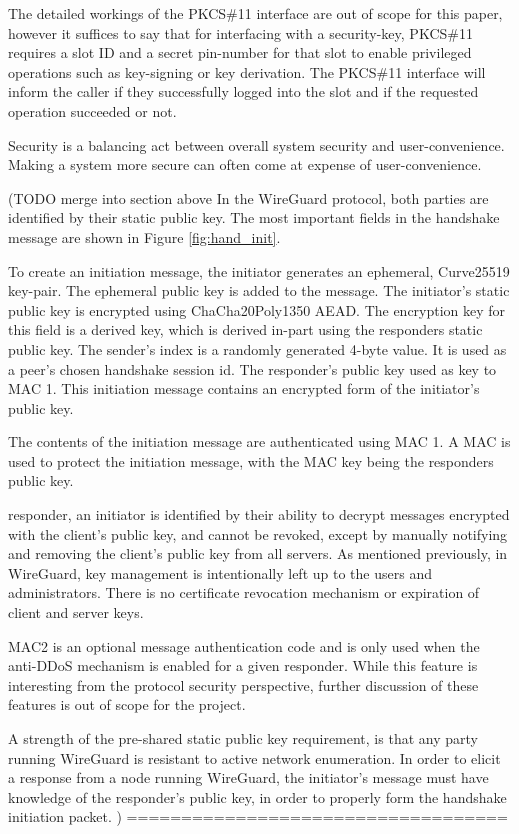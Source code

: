 \documentclass [11pt, proquest] {uwthesis}[2020/02/24]
\begin{document}
The detailed workings of the PKCS\#11 interface are out of scope for this paper, however it suffices to say that for interfacing with a security-key, PKCS\#11 requires a slot ID and a secret pin-number for that slot to enable privileged operations such as key-signing or key derivation. The PKCS\#11 interface will inform the caller if they successfully logged into the slot and if the requested operation succeeded or not.

Security is a balancing act between overall system security and user-convenience. Making a system more secure can often come at expense of user-convenience. 

(TODO merge into section above
In the WireGuard protocol, both parties are identified by their static public key.  The most important fields in the handshake message are shown in Figure \ref{fig:hand_init}.

To create an initiation message, the initiator generates an ephemeral, Curve25519 key-pair. The ephemeral public key is added to the message. The initiator's static public key is encrypted using ChaCha20Poly1350 AEAD. The encryption key for this field is a derived key, which is derived in-part using the responders static public key.
The sender's index is a randomly generated 4-byte value. It is used as a peer's chosen handshake session id.
The responder's public key used as key to MAC 1. This initiation message contains an encrypted form of the initiator's public key.

The contents of the initiation message are authenticated using MAC 1.
A MAC is used to protect the initiation message, with the MAC key being the responders public key.

responder, an initiator is identified by their ability to decrypt messages encrypted with the client's public key, and cannot be revoked, except by manually notifying and removing the client’s public key from all servers. As mentioned previously, in WireGuard, key management is intentionally left up to the users and administrators. There is no certificate revocation mechanism or expiration of client and server keys.

MAC2 is an optional message authentication code and is only used when the anti-DDoS mechanism is enabled for a given responder. While this feature is interesting from the protocol security perspective, further discussion of these features is out of scope for the project.

A strength of the pre-shared static public key requirement, is that any party running WireGuard is resistant to active network enumeration. In order to elicit a response from a node running WireGuard, the initiator's message must have knowledge of the responder's public key, in order to properly form the handshake initiation packet.
)
===================================
\end{document}
